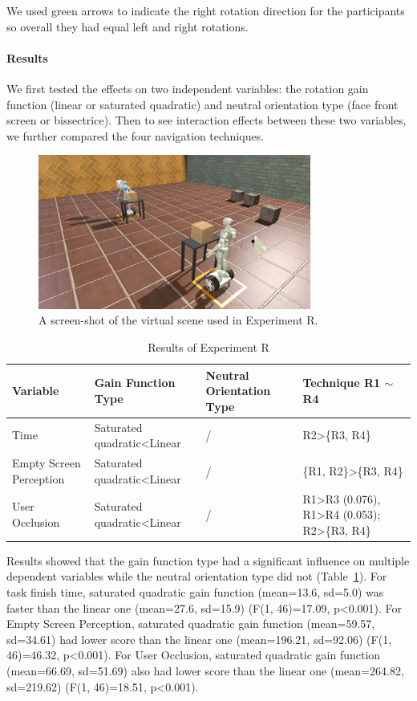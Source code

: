 We used green arrows to indicate the right rotation direction for the participants so overall they had equal left and right rotations.

\paragraph{Results}
We first tested the effects on two independent variables: the rotation gain function (linear or saturated quadratic) and neutral orientation type (face front screen or bissectrice). Then to see interaction effects between these two variables, we further compared the four navigation techniques.

\begin{figure}[tb]
  \centering
  \includegraphics[width=0.8\textwidth]{figures/ch3/t2}
  \caption{\label{fig:3_task2}A screen-shot of the virtual scene used in Experiment R.}
\end{figure}

\begin{table}[!t]
\renewcommand{\arraystretch}{1.3}
\caption{Results of Experiment R}
\label{tab:3_result_t2}
\centering
\begin{tabular}{l l l l}
  \hline
  Variable & Gain Function Type & Neutral Orientation Type & Technique R1 $\sim$ R4 \\
  \hline
  Time & Saturated quadratic\textless Linear & / & R2\textgreater \{R3, R4\} \\
  Empty Screen Perception & Saturated quadratic\textless Linear & / & \{R1, R2\}\textgreater\{R3, R4\} \\
  User Occlusion & Saturated quadratic\textless Linear & / & R1\textgreater R3 (0.076), R1\textgreater R4 (0.053); R2\textgreater \{R3, R4\} \\
  \hline
\end{tabular}
\end{table}

Results showed that the gain function type had a significant influence on multiple dependent variables while the neutral orientation type did not (Table~\ref{tab:3_result_t2}). For task finish time, saturated quadratic gain function (mean=13.6, sd=5.0) was faster than the linear one (mean=27.6, sd=15.9) (F(1, 46)=17.09, p\textless 0.001). For Empty Screen Perception, saturated quadratic gain function (mean=59.57, sd=34.61) had lower score than the linear one (mean=196.21, sd=92.06) (F(1, 46)=46.32, p\textless 0.001). For User Occlusion, saturated quadratic gain function (mean=66.69, sd=51.69) also had lower score than the linear one (mean=264.82, sd=219.62) (F(1, 46)=18.51, p\textless 0.001).


